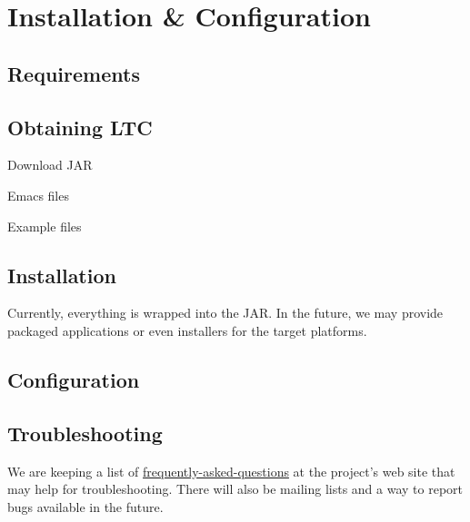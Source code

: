 \chapter{Installation \& Configuration} \label{ch:install}

\section{Requirements}

\section{Obtaining LTC}

Download JAR

Emacs files

Example files

\section{Installation}

Currently, everything is wrapped into the JAR.  In the future, we may provide packaged applications or even installers for the target platforms.

\section{Configuration}

\section{Troubleshooting}

We are keeping a list of \href{../../faq.html}{frequently-asked-questions} at the project's web site that may help for troubleshooting.  There will also be mailing lists and a way to report bugs available in the future.
